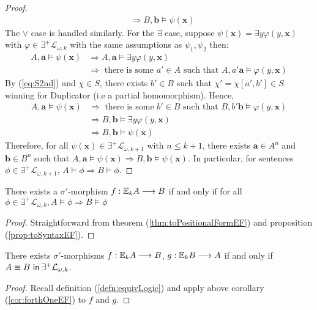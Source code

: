 \begin{prop}
\begin{proof}
\begin{align*}
&\Rightarrow B,\mathbf{b} \vDash \psi(\mathbf{x}) 
\end{align*}
The $\vee$ case is handled similarly. For the $\exists$ case, suppose $\psi(\mathbf{x}) = \exists y \varphi(y,\mathbf{x})$ with $\varphi \in \exists^{+}\mathcal{L}_{\omega,k}$ with the same assumptions as $\psi_{1},\psi_{2}$ then:  
\begin{align*}
A,\mathbf{a} \vDash \psi(\mathbf{x}) &\Rightarrow A,\mathbf{a} \vDash \exists y \varphi(y,\mathbf{x}) \\ 
&\Rightarrow \text{ there is some } a' \in A \text{ such that } A,a'\mathbf{a} \vDash \varphi(y,\mathbf{x}) 
\end{align*}
By (\ref{eq:S2nd}) and $\chi \in S$, there exists $b' \in B$ such that $\chi' = \chi[a',b'] \in S$ winning for Duplicator (i.e a partial homomorphism). Hence,
\begin{align*}
A,\mathbf{a} \vDash \psi(\mathbf{x}) &\Rightarrow \text{ there is some } b' \in B \text{ such that } B,b'\mathbf{b} \vDash \varphi(y,\mathbf{x}) \\  
&\Rightarrow B,\mathbf{b} \vDash \exists y \varphi(y,\mathbf{x}) \\  
&\Rightarrow B,\mathbf{b} \vDash \psi(\mathbf{x})   
\end{align*}
Therefore, for all $\psi(\mathbf{x}) \in \exists^{+}\mathcal{L}_{\omega,k+1}$ with $n \leq k+1$, there exists $\mathbf{a} \in A^{n}$ and $\mathbf{b} \in B^{n}$ such that $A,\mathbf{a} \vDash \psi(\mathbf{x}) \Rightarrow B,\mathbf{b} \vDash \psi(\mathbf{x})$. In particular, for sentences $\phi \in \exists^{+}\mathcal{L}_{\omega,k+1}$, $A \vDash \phi \Rightarrow B \vDash \phi$. 
\end{proof}
\begin{cor}
There exists a $\sigma'$-morphism $f:{\mathbb{E}_{k}A} \longrightarrow B$ if and only if for all $\phi \in \exists^{+}\mathcal{L}_{\omega,k}, A \vDash \phi \Rightarrow B \vDash \phi$
\begin{proof}
Straightforward from theorem (\ref{thm:toPositionalFormEF}) and proposition (\ref{prop:toSyntaxEF}).
\end{proof}
\label{cor:forthOneEF}
\end{cor}
\begin{cor}
There exists $\sigma'$-morphisms $f:{\mathbb{E}_{k}A} \longrightarrow B$, $g:{\mathbb{E}_{k}B} \longrightarrow A$ if and only if ${A \equiv B \ \mathsf{in}\: \exists^{+}\mathcal{L}_{\omega,k}}$. 
\begin{proof}
Recall definition (\ref{defn:equivLogic}) and apply above corollary (\ref{cor:forthOneEF}) to $f$ and $g$.  
\end{proof}
\label{cor:forthEF}
\end{cor}
\label{prop:toSyntaxEF}
\end{prop}
